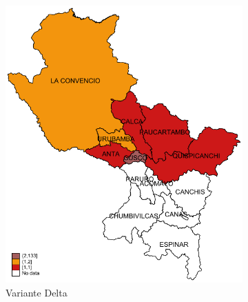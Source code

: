 \documentclass[12pt,a4paper,openany]{book}
\begin{document}
\begin{figure}[h]
		\begin{subfigure}[b]{0.40\textwidth}
			\centering
			\includegraphics[width=\textwidth]{../figuras/variantes_provincial_delta.pdf}
			\caption{Variante Delta}
		\end{subfigure}
		\vspace{0.5mm}
		\hspace{25mm}
		\begin{subfigure}[b]{0.40\textwidth}
			\centering

\end{subfigure}
\end{figure}
\end{document}
